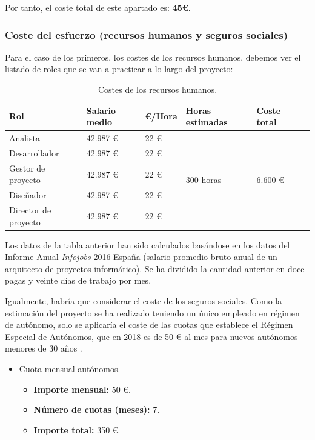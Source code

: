 \documentclass[twoside]{report}
\begin{document}
Por tanto, el coste total de este apartado es: \textbf{45\euro}.

\subsubsection{Coste del esfuerzo (recursos humanos y seguros sociales)}

Para el caso de los primeros, los costes de los recursos humanos, debemos ver el listado de roles que se van a practicar a lo largo del proyecto:

\begin{table}[H]
\center
\begin{tabular}{|l|l|l|l|l|l|}
\hline
Rol                & Salario medio & \euro/Hora   & Horas estimadas & Coste total \\ \hline
Analista           & 42.987 \euro      & 22 \euro & \multirow{5}{*}{300 horas} & \multirow{5}{*}{6.600 \euro} \\\cline{1-3}
Desarrollador      & 42.987 \euro      & 22 \euro  & & \\\cline{1-3}
Gestor de proyecto & 42.987 \euro      & 22 \euro & & \\ \cline{1-3}
Diseñador          & 42.987 \euro      & 22 \euro & & \\ \cline{1-3}
Director de proyecto & 42.987 \euro    & 22 \euro & & \\ \cline{1-3}
\hline
\end{tabular}
\caption{Costes de los recursos humanos.}
\end{table}

Los datos de la tabla anterior han sido calculados basándose en los datos del Informe Anual \textit{Infojobs} 2016 España \cite{infojobs2016} (salario promedio bruto anual de un arquitecto de proyectos informático). Se ha dividido la cantidad anterior en doce pagas y veinte días de trabajo por mes.

Igualmente, habría que considerar el coste de los seguros sociales. Como la estimación del proyecto se ha realizado teniendo un único empleado en régimen de autónomo, solo se aplicaría el coste de las cuotas que establece el Régimen Especial de Autónomos, que en 2018 es de 50 \euro \vspace{0.1cm} al mes para nuevos autónomos menores de 30 años \cite{segsocialautonomos}.

\begin{itemize}
\item Cuota mensual autónomos.
	\begin{itemize}
	\item \textbf{Importe mensual:} 50 \euro.
	\item \textbf{Número de cuotas (meses): } 7.
	\item \textbf{Importe total: } 350 \euro.
	\end{itemize}
\end{itemize}
\end{document}
